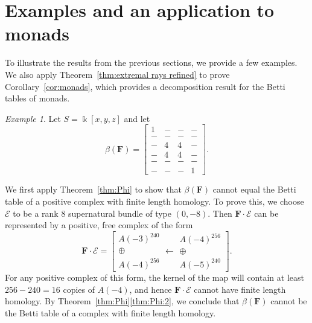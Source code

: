 \documentclass[12pt]{amsart}
\theoremstyle{definition}
\theoremstyle{remark}
\newtheorem{example}[lemma]{Example}
\newcommand{\kk}{\Bbbk}
\newcommand{\PP}{\mathbb{P}}
\newcommand{\cO}{\mathcal{O}}
\newcommand{\cE}{\mathcal{E}}
\newcommand{\FF}{\mathbf{F}}
\newcommand{\Sym}{\operatorname{Sym}} %
\begin{document}
\section{Examples and an application to monads}\label{sec:examples}
To illustrate the results from the previous sections, we provide a few examples.  We also apply Theorem~\ref{thm:extremal rays refined} to prove Corollary~\ref{cor:monads}, which provides a decomposition result for the Betti tables of monads.
\begin{example}\label{ex:1441}
Let $S=\kk[x,y,z]$ and let
\begin{equation}\label{eqn:intro ex}
\beta(\FF)=\begin{bmatrix} 1&-&-&-\\ -&-&-&-\\-&4&4&-\\-&4&4&-\\-&-&-&-\\-&-&-&1 \end{bmatrix}.
\end{equation}


We first apply Theorem~\ref{thm:Phi} to show that $\beta(\FF)$ cannot equal the Betti table of a positive complex with finite length homology.  To prove this, we choose $\cE$ to be a rank $8$ supernatural bundle of type $(0,-8)$.  
Then $\FF\cdot \cE$ can be represented by a positive, free complex of the form
\[
\FF\cdot \cE=\left[ \begin{matrix}A(-3)^{240}\\ \oplus \\A(-4)^{256}\end{matrix} \longleftarrow \begin{matrix}A(-4)^{256}\\\oplus \\ A(-5)^{240}\end{matrix}\right].
\]
For any positive complex of this form, the kernel of the map will contain at least $256-240=16$ copies of $A(-4)$, and hence $\FF\cdot \cE$ cannot have finite length homology.  By Theorem~\ref{thm:Phi}\eqref{thm:Phi:2}, we conclude that $\beta(\FF)$ cannot be the Betti table of a complex with finite length homology.


\end{example}
\end{document}
